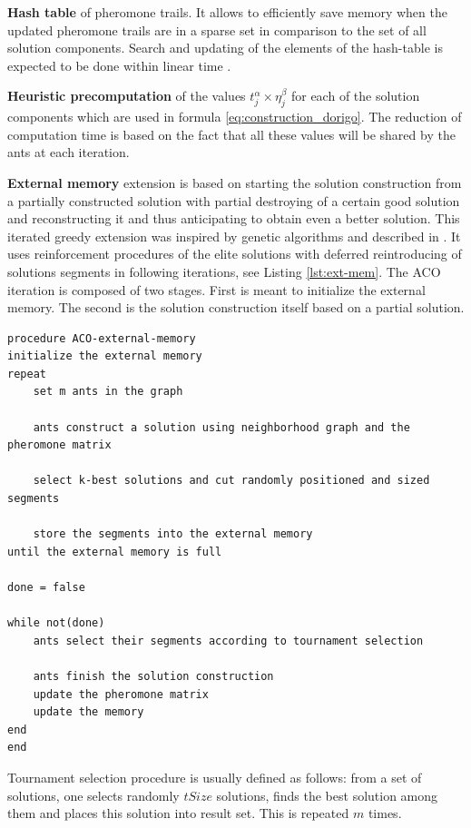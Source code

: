 \documentclass[12pt,a4paper,oneside]{book}
\begin{document}
\textbf{Hash table} of pheromone trails. It allows to efficiently save memory when the updated pheromone trails are in a sparse set in comparison to the set of all solution components. Search and updating of the elements of the hash-table is expected to be done within linear time \cite{DBLP:conf/gecco/AlbaC07}.

\textbf{Heuristic precomputation} of the values $t_j^\alpha \times \eta_j^\beta$ for each of the solution components which are used in formula \eqref{eq:construction_dorigo}. The reduction of computation time is based on the fact that all these values will be shared by the ants at each iteration.

\textbf{External memory} extension is based on starting the solution construction from a partially constructed solution with partial destroying of a certain good solution and reconstructing it and thus anticipating to obtain even a better solution. This iterated greedy extension was inspired by genetic algorithms and described in \cite{10.1007/978-3-540-28646-2_7}. It uses reinforcement procedures of the elite solutions with deferred reintroducing of solutions segments in following iterations, see Listing \ref{lst:ext-mem}. The ACO iteration is composed of two stages. First is meant to initialize the external memory. The second is the solution construction itself based on a partial solution. 

\begin{minipage}[c, breaklines=true]{0.95\textwidth}
\begin{lstlisting}[caption={External memory iteration pseudo-code}, label={lst:ext-mem}]
procedure ACO-external-memory
initialize the external memory
repeat
	set m ants in the graph
	
	ants construct a solution using neighborhood graph and the pheromone matrix
	
	select k-best solutions and cut randomly positioned and sized segments
	
	store the segments into the external memory
until the external memory is full

done = false

while not(done)
	ants select their segments according to tournament selection
	
	ants finish the solution construction
	update the pheromone matrix
	update the memory
end
end
\end{lstlisting}
\end{minipage}

Tournament selection procedure is usually defined as follows: from a set of solutions, one selects randomly $tSize$ solutions, finds the best solution among them and places this solution into result set. This is repeated $m$ times.
\end{document}
